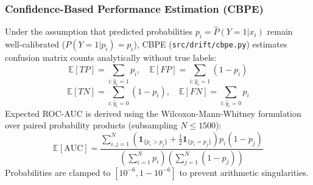 \documentclass[conference]{IEEEtran}
\begin{document}
\subsubsection{Confidence-Based Performance Estimation (CBPE)}
Under the assumption that predicted probabilities $p_i = \hat{P}(Y=1|x_i)$ remain well-calibrated ($P(Y=1|p_i) = p_i$), CBPE (\texttt{src/drift/cbpe.py}) estimates confusion matrix counts analytically without true labels:
\begin{equation}
\mathbb{E}[TP] = \sum_{i: \hat{y}_i = 1} p_i, \quad \mathbb{E}[FP] = \sum_{i: \hat{y}_i = 1} (1 - p_i)
\end{equation}
\begin{equation}
\mathbb{E}[TN] = \sum_{i: \hat{y}_i = 0} (1 - p_i), \quad \mathbb{E}[FN] = \sum_{i: \hat{y}_i = 0} p_i
\end{equation}
Expected ROC-AUC is derived using the Wilcoxon-Mann-Whitney formulation over paired probability products (subsampling $N \le 1500$):
\begin{equation}
\mathbb{E}[\text{AUC}] = \frac{\sum_{i,j=1}^N \left( \mathbf{1}_{\{p_i > p_j\}} + \tfrac{1}{2}\mathbf{1}_{\{p_i = p_j\}} \right) p_i (1 - p_j)}{\left( \sum_{i=1}^N p_i \right) \left( \sum_{j=1}^N (1 - p_j) \right)}
\end{equation}
Probabilities are clamped to $[10^{-6}, 1 - 10^{-6}]$ to prevent arithmetic singularities.
\end{document}
